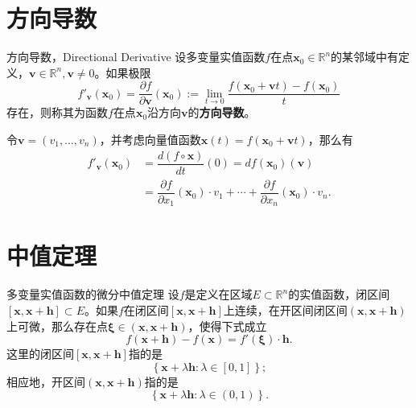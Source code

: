 
\section{方向导数}


\begin{frame}

\begin{block}{方向导数，Directional Derivative}
设多变量实值函数$f$在点$\mathbf{x}_0 \in \mathbb{R}^n$的某邻域中有定义，$\mathbf{v} \in \mathbb{R}^n, \mathbf{v} \neq 0$。如果极限
\[f'_{\mathbf{v}}(\mathbf{x}_0) = \dfrac{\partial f}{\partial \mathbf{v}}(\mathbf{x}_0) := \lim\limits_{t \to 0} \dfrac{f(\mathbf{x}_0 + \mathbf{v}t) - f(\mathbf{x}_0)}{t}\]
存在，则称其为函数$f$在点$\mathbf{x}_0$沿方向$\mathbf{v}$的{\bfseries 方向导数}。
\end{block}

\pause

令$\mathbf{v} = (v_1,\ldots,v_n)$，并考虑向量值函数$\mathbf{x}(t) = f(\mathbf{x}_0 + \mathbf{v}t)$，那么有
\begin{align*}
f'_{\mathbf{v}}(\mathbf{x}_0) & = \dfrac{d(f\circ \mathbf{x})}{dt}(0) = df(\mathbf{x}_0)(\mathbf{v})\\
& = \dfrac{\partial f}{\partial x_1}(\mathbf{x}_0) \cdot v_1 + \cdots + \dfrac{\partial f}{\partial x_n}(\mathbf{x}_0) \cdot v_n.
\end{align*}

\end{frame}


\section{中值定理}


\begin{frame}

\begin{block}{多变量实值函数的微分中值定理}
设$f$是定义在区域$E \subset \mathbb{R}^n$的实值函数，闭区间$[\mathbf{x}, \mathbf{x} + \mathbf{h}] \subset E$。如果$f$在闭区间$[\mathbf{x}, \mathbf{x} + \mathbf{h}]$上连续，在开区间闭区间$(\mathbf{x}, \mathbf{x} + \mathbf{h})$上可微，那么存在点$\mathbf{\xi} \in (\mathbf{x}, \mathbf{x} + \mathbf{h})$，使得下式成立
\[f(\mathbf{x} + \mathbf{h}) - f(\mathbf{x}) = f'(\mathbf{\xi})\cdot\mathbf{h}.\]
这里的闭区间$[\mathbf{x}, \mathbf{x} + \mathbf{h}]$指的是
\[\left\{ \mathbf{x} + \lambda \mathbf{h}: \lambda \in [0,1] \right\};\]
相应地，开区间$(\mathbf{x}, \mathbf{x} + \mathbf{h})$指的是
\[\left\{ \mathbf{x} + \lambda \mathbf{h}: \lambda \in (0,1) \right\}.\]
\end{block}

\end{frame}

